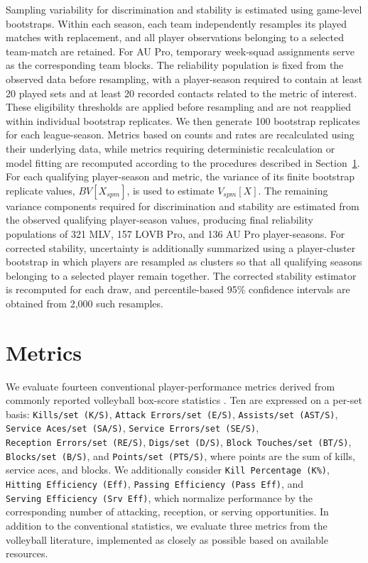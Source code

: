 \documentclass[
  12pt]{article}
\begin{document}
Sampling variability for discrimination and stability is estimated using
game-level bootstraps. Within each season, each team independently
resamples its played matches with replacement, and all player
observations belonging to a selected team-match are retained. For AU
Pro, temporary week-squad assignments serve as the corresponding team
blocks. The reliability population is fixed from the observed data
before resampling, with a player-season required to contain at least 20
played sets and at least 20 recorded contacts related to the metric of
interest. These eligibility thresholds are applied before resampling and
are not reapplied within individual bootstrap replicates. We then
generate 100 bootstrap replicates for each league-season. Metrics based
on counts and rates are recalculated using their underlying data, while
metrics requiring deterministic recalculation or model fitting are
recomputed according to the procedures described in
Section~\ref{sec-metrics}. For each qualifying player-season and metric,
the variance of its finite bootstrap replicate values, \(BV[X_{spm}]\),
is used to estimate \(V_{spm}[X]\). The remaining variance components
required for discrimination and stability are estimated from the
observed qualifying player-season values, producing final reliability
populations of 321 MLV, 157 LOVB Pro, and 136 AU Pro player-seasons. For
corrected stability, uncertainty is additionally summarized using a
player-cluster bootstrap in which players are resampled as clusters so
that all qualifying seasons belonging to a selected player remain
together. The corrected stability estimator is recomputed for each draw,
and percentile-based 95\% confidence intervals are obtained from 2,000
such resamples.

\section{Metrics}\label{sec-metrics}

We evaluate fourteen conventional player-performance metrics derived
from commonly reported volleyball box-score statistics
\citep{major_league_volleyball_statistics_2024}. Ten are expressed on a
per-set basis: \texttt{Kills/set\ (K/S)},
\texttt{Attack\ Errors/set\ (E/S)}, \texttt{Assists/set\ (AST/S)},
\texttt{Service\ Aces/set\ (SA/S)},
\texttt{Service\ Errors/set\ (SE/S)},
\texttt{Reception\ Errors/set\ (RE/S)}, \texttt{Digs/set\ (D/S)},
\texttt{Block\ Touches/set\ (BT/S)}, \texttt{Blocks/set\ (B/S)}, and
\texttt{Points/set\ (PTS/S)}, where points are the sum of kills, service
aces, and blocks. We additionally consider
\texttt{Kill\ Percentage\ (K\%)}, \texttt{Hitting\ Efficiency\ (Eff)},
\texttt{Passing\ Efficiency\ (Pass\ Eff)}, and
\texttt{Serving\ Efficiency\ (Srv\ Eff)}, which normalize performance by
the corresponding number of attacking, reception, or serving
opportunities. In addition to the conventional statistics, we evaluate
three metrics from the volleyball literature, implemented as closely as
possible based on available resources.
\end{document}
